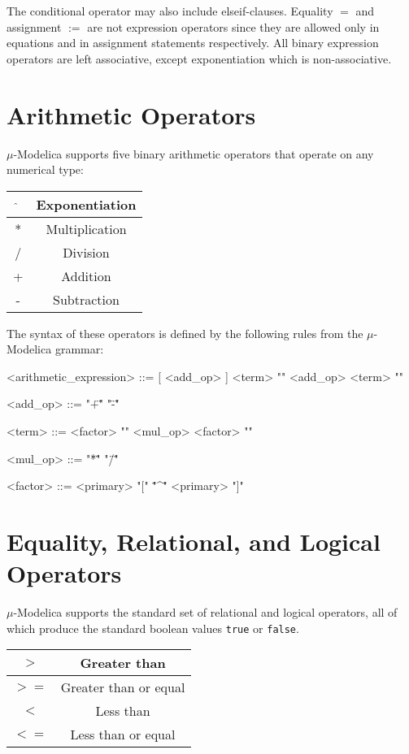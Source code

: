 \documentclass[11pt,a4paper,notitlepage]{report}
\begin{document}
The conditional operator may also include elseif-clauses. Equality $=$ and assignment $:=$ are not expression operators since they are allowed only in equations and in assignment statements respectively. All binary expression operators are left associative, except exponentiation which is non-associative. 

\section{Arithmetic Operators}

\FloatBarrier
$\mu$-Modelica supports five binary arithmetic operators that operate on any numerical type:
\begin{center}
\begin{tabular}{|c|c|}
	\hline
	$\hat{}$ & Exponentiation \\	
	\hline
	* & Multiplication \\
	\hline
	/ & Division \\
	\hline 	 
	+ & Addition \\  	 
	\hline
	- & Subtraction \\
	\hline
\end{tabular}
\label{tab:arithmeticOperators}
\end{center}
The syntax of these operators is defined by the following rules from the $\mu$-Modelica grammar:
\begin{grammar}\scriptsize
<arithmetic_expression> ::= [ <add_op> ] <term> "{" <add_op> <term> "}"

<add_op> ::= "\"+\"" 
\alt "\"-\""

<term> ::= <factor> "{" <mul_op> <factor> "}"

<mul_op> ::= "\"*\"" 
\alt "\"/\""

<factor> ::= <primary> "[" "\"^\"" <primary> "]"
\end{grammar}

\section{Equality, Relational, and Logical Operators}
\FloatBarrier
$\mu$-Modelica supports the standard set of relational and logical operators, all of which produce the standard boolean values \verb"true" or \verb"false".

\begin{center}
\begin{tabular}{|c|c|}
	\hline
	$>$ & Greater than \\	
	\hline
	$>=$ & Greater than or equal \\
	\hline
	$<$ & Less than \\
	\hline 	 
	$<=$ & Less than or equal \\  	 
	\hline
\end{tabular}
\end{center}
\end{document}
